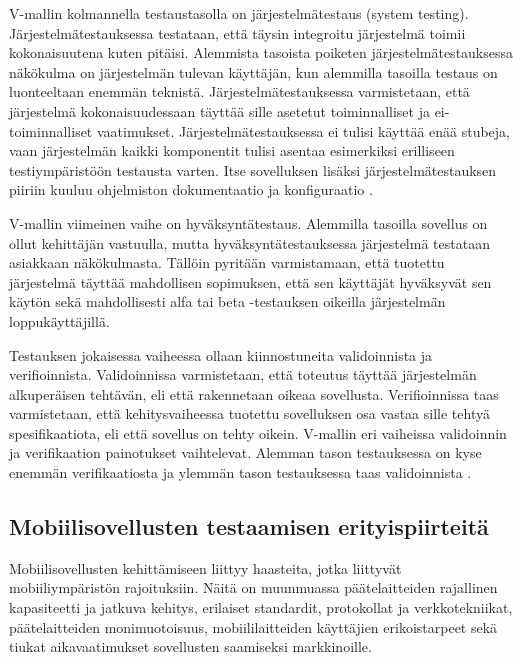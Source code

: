 V-mallin kolmannella testaustasolla on järjestelmätestaus (system testing). Järjestelmätestauksessa testataan, että täysin integroitu järjestelmä toimii kokonaisuutena kuten pitäisi. Alemmista tasoista poiketen järjestelmätestauksessa näkökulma on järjestelmän tulevan käyttäjän, kun alemmilla tasoilla testaus on luonteeltaan enemmän teknistä. Järjestelmätestauksessa varmistetaan, että järjestelmä kokonaisuudessaan täyttää sille asetetut toiminnalliset ja ei-toiminnalliset vaatimukset. Järjestelmätestauksessa ei tulisi käyttää enää stubeja, vaan järjestelmän kaikki komponentit tulisi asentaa esimerkiksi erilliseen testiympäristöön testausta varten. Itse sovelluksen lisäksi järjestelmätestauksen piiriin kuuluu ohjelmiston dokumentaatio ja konfiguraatio \cite[58-61]{testing_foundations}.

V-mallin viimeinen vaihe on hyväksyntätestaus. Alemmilla tasoilla sovellus on ollut kehittäjän vastuulla, mutta hyväksyntätestauksessa järjestelmä testataan asiakkaan näkökulmasta. Tällöin pyritään varmistamaan, että tuotettu järjestelmä täyttää mahdollisen sopimuksen, että sen käyttäjät hyväksyvät sen käytön sekä mahdollisesti alfa tai beta -testauksen oikeilla järjestelmän loppukäyttäjillä.\cite[62-]{testing_foundations}

Testauksen jokaisessa vaiheessa ollaan kiinnostuneita validoinnista ja verifioinnista. Validoinnissa varmistetaan, että toteutus täyttää järjestelmän alkuperäisen tehtävän, eli että rakennetaan oikeaa sovellusta. Verifioinnissa taas varmistetaan, että kehitysvaiheessa tuotettu sovelluksen osa vastaa sille tehtyä spesifikaatiota, eli että sovellus on tehty oikein. V-mallin eri vaiheissa validoinnin ja verifikaation painotukset vaihtelevat. Alemman tason testauksessa on kyse enemmän verifikaatiosta ja ylemmän tason testauksessa taas validoinnista \cite[41-42]{testing_foundations}.

\subsection{Mobiilisovellusten testaamisen erityispiirteitä}

Mobiilisovellusten kehittämiseen liittyy haasteita, jotka liittyvät mobiiliympäristön rajoituksiin. Näitä on muunmuassa päätelaitteiden rajallinen kapasiteetti ja jatkuva kehitys, erilaiset standardit, protokollat ja verkkotekniikat, päätelaitteiden monimuotoisuus, mobiililaitteiden käyttäjien erikoistarpeet sekä tiukat aikavaatimukset sovellusten saamiseksi markkinoille.

